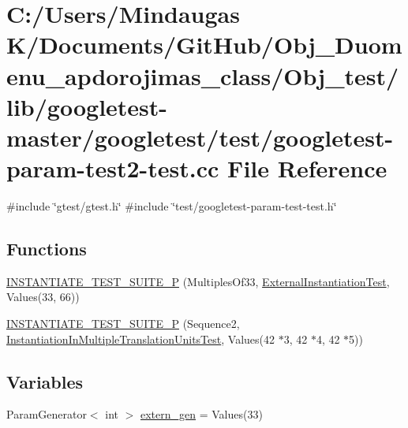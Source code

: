 \hypertarget{_obj__test_2lib_2googletest-master_2googletest_2test_2googletest-param-test2-test_8cc}{}\section{C\+:/\+Users/\+Mindaugas K/\+Documents/\+Git\+Hub/\+Obj\+\_\+\+Duomenu\+\_\+apdorojimas\+\_\+class/\+Obj\+\_\+test/lib/googletest-\/master/googletest/test/googletest-\/param-\/test2-\/test.cc File Reference}
\label{_obj__test_2lib_2googletest-master_2googletest_2test_2googletest-param-test2-test_8cc}
{\ttfamily \#include \char`\"{}gtest/gtest.\+h\char`\"{}}\newline
{\ttfamily \#include \char`\"{}test/googletest-\/param-\/test-\/test.\+h\char`\"{}}\newline
\subsection*{Functions}
\begin{DoxyCompactItemize}
\item 
\mbox{\hyperlink{_obj__test_2lib_2googletest-master_2googletest_2test_2googletest-param-test2-test_8cc_a9092fbc5f642e0be66474b214fae76c9}{I\+N\+S\+T\+A\+N\+T\+I\+A\+T\+E\+\_\+\+T\+E\+S\+T\+\_\+\+S\+U\+I\+T\+E\+\_\+P}} (Multiples\+Of33, \mbox{\hyperlink{class_external_instantiation_test}{External\+Instantiation\+Test}}, Values(33, 66))
\item 
\mbox{\hyperlink{_obj__test_2lib_2googletest-master_2googletest_2test_2googletest-param-test2-test_8cc_a636f24ec7688ea5d70c09b8b73639e55}{I\+N\+S\+T\+A\+N\+T\+I\+A\+T\+E\+\_\+\+T\+E\+S\+T\+\_\+\+S\+U\+I\+T\+E\+\_\+P}} (Sequence2, \mbox{\hyperlink{class_instantiation_in_multiple_translation_units_test}{Instantiation\+In\+Multiple\+Translation\+Units\+Test}}, Values(42 $\ast$3, 42 $\ast$4, 42 $\ast$5))
\end{DoxyCompactItemize}
\subsection*{Variables}
\begin{DoxyCompactItemize}
\item 
Param\+Generator$<$ int $>$ \mbox{\hyperlink{_obj__test_2lib_2googletest-master_2googletest_2test_2googletest-param-test2-test_8cc_a0f691f1461778d71f30b1fb1dea1cb50}{extern\+\_\+gen}} = Values(33)
\end{DoxyCompactItemize}


